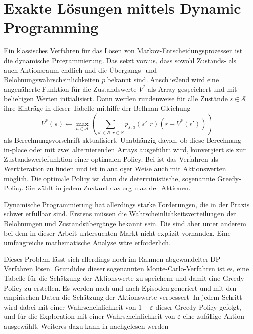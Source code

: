\section{Exakte Lösungen mittels Dynamic Programming}
\label{section:dp}
Ein klassisches Verfahren für das Lösen von Markov-Entscheidungsprozessen ist die dynamische Programmierung.
Das setzt voraus, dass sowohl Zustands- als auch Aktionsraum endlich und die Übergangs- und Belohnungswahrscheinlichkeiten $p$ bekannt sind.
Anschließend wird eine angenäherte Funktion für die Zustandswerte $V^*$ als Array gespeichert und mit beliebigen Werten initialisiert.
Dann werden rundenweise für alle Zustände $s\in\mathcal{S}$ ihre Einträge in dieser Tabelle mithilfe der Bellman-Gleichung
\begin{equation}
	V^*(s) \leftarrow \max_{a\in\mathcal{A}}{\left(\sum_{s'\in\mathcal{S}, r \in \mathbb{R}}{p_{s, a}\left(s', r\right) \left(r + V^*(s')\right)}\right)}
\end{equation}
als Berechnungsvorschrift aktualisiert.
Unabhängig davon, ob diese Berechnung in-place oder mit zwei alternierenden Arrays ausgeführt wird, konvergiert sie zur Zustandswertefunktion einer optimalen Policy.
Bei \cite{Sutton1998} ist das Verfahren als Wertiteration zu finden und ist in analoger Weise auch mit Aktionswerten möglich.
Die optimale Policy ist dann die deterministische, sogenannte Greedy-Policy.
Sie wählt in jedem Zustand das arg max der Aktionen.

Dynamische Programmierung hat allerdings starke Forderungen, die in der Praxis schwer erfüllbar sind.
Erstens müssen die Wahrscheinlichkeitsverteilungen der Belohnungen und Zustandsübergänge bekannt sein.
Die sind aber unter anderem bei dem in dieser Arbeit untersuchten Markt nicht explizit vorhanden.
Eine umfangreiche mathematische Analyse wäre erforderlich.

Dieses Problem lässt sich allerdings noch im Rahmen abgewandelter DP-Verfahren lösen.
Grundidee dieser sogenannten Monte-Carlo-Verfahren ist es, eine Tabelle für die Schätzung der Aktionswerte zu speichern und damit eine Greedy-Policy zu erstellen.
Es werden nach und nach Episoden generiert und mit den empirischen Daten die Schätzung der Aktionswerte verbessert.
In jedem Schritt wird dabei mit einer Wahrscheinlichkeit von $1-\varepsilon$ dieser Greedy-Policy gefolgt, und für die Exploration mit einer Wahrscheinlichkeit von $\varepsilon$ eine zufällige Aktion ausgewählt.
Weiteres dazu kann in \cite{Sutton1998} nachgelesen werden.

